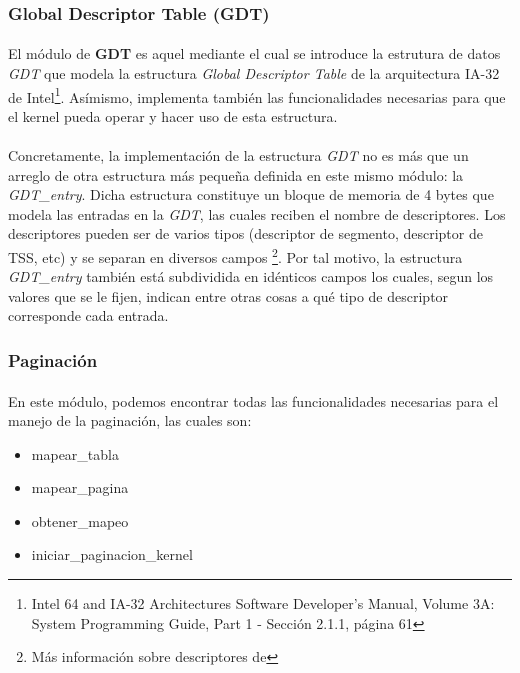 \documentclass[11pt, a4paper]{article}
\begin{document}
		\subsubsection{Global Descriptor Table (GDT)}
			\paragraph{}
			El módulo de \textbf{GDT} es aquel mediante el cual se introduce la estrutura de datos \textit{GDT} que modela la estructura \textit{Global Descriptor Table} de la arquitectura IA-32 de Intel\footnote{Intel 64 and IA-32 Architectures Software Developer’s Manual, Volume 3A: System Programming Guide, Part 1 - Sección 2.1.1, página 61}. Asímismo, implementa también las funcionalidades necesarias para que el kernel pueda operar y hacer uso de esta estructura.
			
			\paragraph{}
			Concretamente, la implementación de la estructura \textit{GDT} no es más que un arreglo de otra estructura más pequeña definida en este mismo módulo: la \textit{GDT\_entry}. Dicha estructura constituye un bloque de memoria de 4 bytes que modela las entradas en la \textit{GDT}, las cuales reciben el nombre de descriptores. Los descriptores pueden ser de varios tipos (descriptor de segmento, descriptor de TSS, etc) y se separan en diversos campos \footnote{Más información sobre descriptores de}. Por tal motivo, la estructura \textit{GDT\_entry} también está subdividida en idénticos campos los cuales, segun los valores que se le fijen, indican entre otras cosas a qué tipo de descriptor corresponde cada entrada.
			
			
				
		\subsubsection{Paginación}
			\paragraph{}
			En este módulo, podemos encontrar todas las funcionalidades necesarias para el manejo de la paginación, las cuales son:
			\begin{itemize}
				\item mapear_tabla
				\item mapear_pagina
				\item obtener_mapeo
				\item iniciar_paginacion_kernel
			\end{itemize}
			
\end{document}
